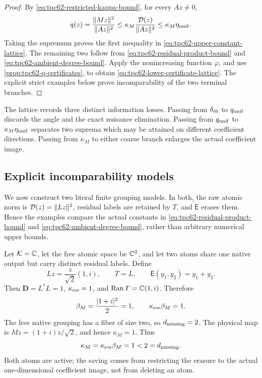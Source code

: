\begin{proof}
By \eqref{eq:tpc62-restricted-kappa-bound}, for every \(Az\ne0\),
\[
 q(z)
 =\frac{\|Mz\|^2}{\|Az\|^2}
 \le\kappa_M\frac{\mathcal D(z)}{\|Az\|^2}
 \le\kappa_M\eta_{\rm unif}.
\]
Taking the supremum proves the first inequality in
\eqref{eq:tpc62-upper-constant-lattice}.  The remaining two follow from
\eqref{eq:tpc62-residual-product-bound} and
\eqref{eq:tpc62-ambient-degree-bound}.  Apply the nonincreasing function
\(\varphi\), and use
\cref{prop:tpc62-q-certificates}, to obtain
\eqref{eq:tpc62-lower-certificate-lattice}.  The explicit strict examples
below prove incomparability of the two terminal branches.
\end{proof}

The lattice records three distinct information losses.  Passing from
\(\delta_{\rm sh}\) to \(q_{\rm unif}\) discards the angle and the exact
nuisance elimination.  Passing from \(q_{\rm unif}\) to
\(\kappa_M\eta_{\rm unif}\) separates two suprema which may be attained
on different coefficient directions.  Passing from \(\kappa_M\) to
either coarse branch enlarges the actual coefficient image.

\subsection{Explicit incomparability models}

We now construct two literal finite grouping models.  In both, the raw
atomic norm is \(\mathcal D(z)=\|Lz\|^2\), residual labels are retained by \(T\),
and \(\mathsf E\) erases them.  Hence the examples compare the actual
constants in \eqref{eq:tpc62-residual-product-bound} and
\eqref{eq:tpc62-ambient-degree-bound}, rather than arbitrary numerical
upper bounds.

\begin{example}
\label{ex:tpc62-residual-better-than-ambient}
Let \(\mathcal K=\mathbb C\), let the free atomic space be \(\mathbb C^2\), and let two atoms
share one native output but carry distinct residual labels.  Define
\begin{equation}
 Lz=\frac{z}{\sqrt2}(1,i),
 \qquad
 T=L,
 \qquad
 \mathsf E(y_1,y_2)=y_1+y_2.
 \label{eq:tpc62-residual-better-model}
\end{equation}
Then \(\mathbf D=L^*L=1\), \(\kappa_{\rm res}=1\), and
\(\operatorname{Ran} T=\mathbb C(1,i)\).  Therefore
\begin{equation}
 \beta_M
 =\frac{|1+i|^2}{2}=1,
 \qquad
 \kappa_{\rm res}\beta_M=1.
 \label{eq:tpc62-residual-better-product}
\end{equation}
The free native grouping has a fiber of size two, so
\(d_{\rm missing}=2\).  The physical map is
\(Mz=(1+i)z/\sqrt2\), and hence \(\kappa_M=1\).  Thus
\begin{equation}
 \kappa_M=\kappa_{\rm res}\beta_M=1<2=d_{\rm missing}.
 \label{eq:tpc62-residual-strictly-better}
\end{equation}
Both atoms are active; the saving comes from restricting the erasure to
the actual one-dimensional coefficient image, not from deleting an atom.
\end{example}

